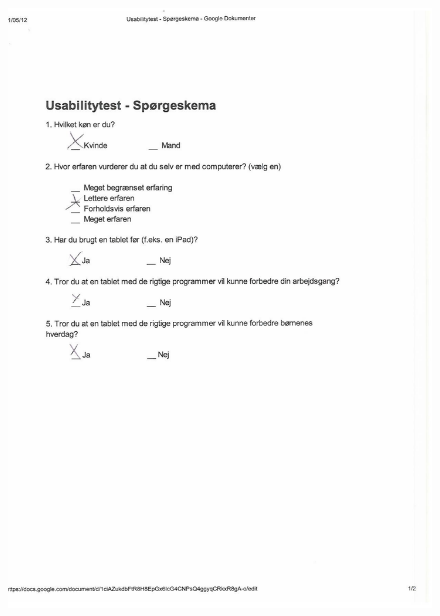 \begin{figure}[H]
	\centering
		\includegraphics{Appendix/demo_m1.pdf}
	\label{fig:demo_t3}
\end{figure}

